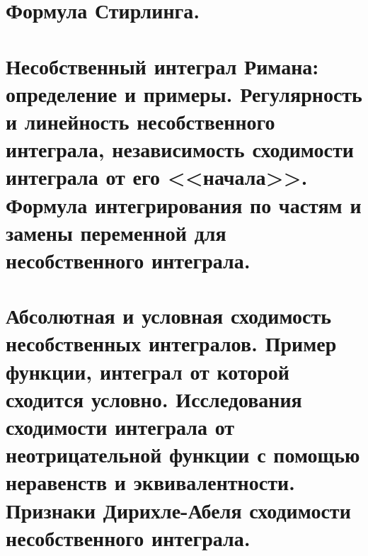 \documentclass[a4paper]{article}
\theoremstyle{named}
\begin{document}
    \section{Формула Стирлинга.}

    \section{Несобственный интеграл Римана: определение и примеры. Регулярность и линейность несобственного интеграла, независимость сходимости интеграла от его <<начала>>. Формула интегрирования по частям и замены переменной для несобственного интеграла.}

    \section{Абсолютная и условная сходимость несобственных интегралов. Пример функции, интеграл от которой сходится условно. Исследования сходимости интеграла от неотрицательной функции с помощью неравенств и эквивалентности. Признаки Дирихле-Абеля сходимости несобственного интеграла.}
\end{document}
